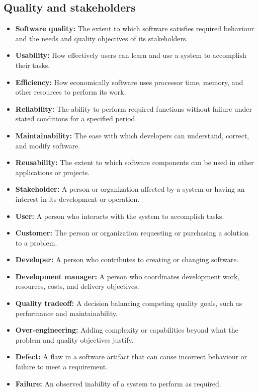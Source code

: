 \documentclass[11pt]{article}
\newenvironment{DottedList}{%
  \begin{itemize}[leftmargin=2em, itemsep=0.35em, topsep=0.35em, label=\textbullet]
}{%
  \end{itemize}
}
\begin{document}
\subsection*{Quality and stakeholders}
\begin{DottedList}
  \item \textbf{Software quality:} The extent to which software satisfies required behaviour and the needs and quality objectives of its stakeholders.
  \item \textbf{Usability:} How effectively users can learn and use a system to accomplish their tasks.
  \item \textbf{Efficiency:} How economically software uses processor time, memory, and other resources to perform its work.
  \item \textbf{Reliability:} The ability to perform required functions without failure under stated conditions for a specified period.
  \item \textbf{Maintainability:} The ease with which developers can understand, correct, and modify software.
  \item \textbf{Reusability:} The extent to which software components can be used in other applications or projects.
  \item \textbf{Stakeholder:} A person or organization affected by a system or having an interest in its development or operation.
  \item \textbf{User:} A person who interacts with the system to accomplish tasks.
  \item \textbf{Customer:} The person or organization requesting or purchasing a solution to a problem.
  \item \textbf{Developer:} A person who contributes to creating or changing software.
  \item \textbf{Development manager:} A person who coordinates development work, resources, costs, and delivery objectives.
  \item \textbf{Quality tradeoff:} A decision balancing competing quality goals, such as performance and maintainability.
  \item \textbf{Over-engineering:} Adding complexity or capabilities beyond what the problem and quality objectives justify.
  \item \textbf{Defect:} A flaw in a software artifact that can cause incorrect behaviour or failure to meet a requirement.
  \item \textbf{Failure:} An observed inability of a system to perform as required.
\end{DottedList}
\end{document}

